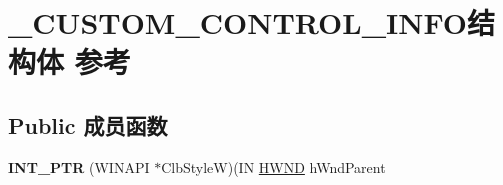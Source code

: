 \hypertarget{struct___c_u_s_t_o_m___c_o_n_t_r_o_l___i_n_f_o}{}\section{\+\_\+\+C\+U\+S\+T\+O\+M\+\_\+\+C\+O\+N\+T\+R\+O\+L\+\_\+\+I\+N\+F\+O结构体 参考}
\label{struct___c_u_s_t_o_m___c_o_n_t_r_o_l___i_n_f_o}
\subsection*{Public 成员函数}
\begin{DoxyCompactItemize}
\item 
\mbox{\label{struct___c_u_s_t_o_m___c_o_n_t_r_o_l___i_n_f_o_a5093e14d6cf14b0e8de838340c95cca9}} 
{\bfseries I\+N\+T\+\_\+\+P\+TR} (W\+I\+N\+A\+PI $\ast$Clb\+StyleW)(IN \hyperlink{interfacevoid}{H\+W\+ND} h\+Wnd\+Parent
\end{DoxyCompactItemize}
